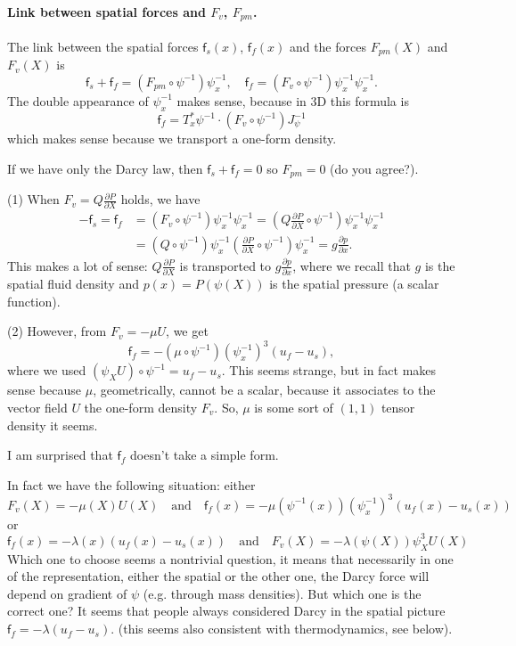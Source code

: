\documentclass[12pt]{article}
\numberwithin{theorem}{section}
\newcommand{\pp}[2]{\frac{\partial #1}{\partial #2}}
\begin{document}
\begin{framed}
\paragraph{Link between spatial forces and $F_v$, $F_{pm}$.}
The link between the spatial forces $\mathsf{f}_s(x)$, $\mathsf{f}_f(x)$ and the forces $F_{pm}(X)$ and $F_v(X)$ is
\begin{equation}\label{transform_f}
\mathsf{f}_s+\mathsf{f}_f= (F_{pm}\circ\psi^{-1})\psi^{-1}_x,\quad \mathsf{f}_f=(F_v\circ\psi^{-1})\psi_x^{-1}\psi_x^{-1}.
\end{equation}
The double appearance of $\psi_x^{-1}$ makes sense, because in 3D this formula is
\[
\mathsf{f}_f= T_x^*\psi^{-1}\cdot (F_v\circ \psi^{-1})J_\psi^{-1}
\]
which makes sense because we transport a one-form density.
\medskip

If we have only the Darcy law, then $\mathsf{f}_s+\mathsf{f}_f=0$ so $F_{pm}=0$ (do you agree?).

\medskip

(1) When $F_v= Q \pp{P}{X}$ holds, we have
\begin{align*}
-\mathsf{f}_s=\mathsf{f}_f&=(F_v\circ\psi^{-1})\psi_x^{-1}\psi_x^{-1}= \left(Q \pp{P}{X} \circ\psi^{-1}\right)\psi_x^{-1}\psi_x^{-1}\\
&=(Q\circ\psi^{-1})  \psi_x^{-1}\left(\pp{P}{X} \circ\psi^{-1}\right)\psi_x^{-1} = g\frac{\partial p}{\partial x}.
\end{align*}
This makes a lot of sense: $Q \pp{P}{X}$ is transported to $g\frac{\partial p}{\partial x}$, where we recall that $g$ is the spatial fluid density  and $p(x)=P(\psi(X))$ is the spatial pressure (a scalar function).

\medskip


(2) However, from $F_v=-\mu U$, we get
\[
\mathsf{f}_f= - (\mu \circ \psi^{-1})(\psi^{-1}_x)^3(u_f-u_s),
\]
where we used $(\psi_XU)\circ\psi^{-1}=u_f-u_s$. This seems strange, but in fact makes sense because $\mu$, geometrically, cannot be a scalar, because it associates to the vector field $U$ the one-form density $F_v$. So, $\mu$ is some sort of $(1,1)$ tensor density it seems.

I am surprised that $\mathsf{f}_f$ doesn't take a simple form.


\medskip


In fact we have the following situation: either
\[
F_v(X)= -\mu(X) U(X) \quad\text{and}\quad \mathsf{f}_f(x)= - \mu (\psi^{-1}(x))(\psi^{-1}_x)^3(u_f(x)-u_s(x))
\]
or
\[
\mathsf{f}_f(x)= - \lambda(x) (u_f(x)-u_s(x)) \quad\text{and}\quad F_v(X)= -\lambda(\psi(X))\psi_X^3 U(X)
\]
Which one to choose seems a nontrivial question, it means that necessarily in one of the representation, either the spatial or the other one, the Darcy force will depend on gradient of $\psi$ (e.g. through mass densities). But which one is the correct one?
It seems that people always considered Darcy in the spatial picture $\mathsf{f}_f= - \lambda (u_f-u_s)$. (this seems also consistent with thermodynamics, see below).




\end{framed}
\end{document}
